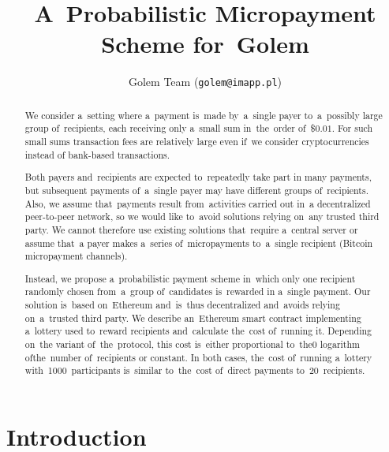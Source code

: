 \documentclass[a4paper]{article}
\title{A~Probabilistic Micropayment Scheme for~Golem}
\author{Golem Team (\texttt{golem@imapp.pl})}
\begin{document}
\maketitle

\begin{abstract}
    We consider a~setting where a~payment  is~made by~a~single payer
    to~a~possibly large group of~recipients, each receiving only a~small
    sum in~the~order of~\$$0.01$. For such small sums transaction fees are
    relatively large even if~we consider cryptocurrencies instead of
    bank-based transactions.

    Both payers and~recipients are expected to~repeatedly take part in
    many payments, but subsequent payments of~a~single payer may
    have different groups of~recipients. Also, we
    assume that~payments result from~activities carried out in~a
    decentralized peer-to-peer network, so we would like to~avoid
    solutions relying on~any trusted third party. We cannot therefore use
    existing solutions that~require a~central server or assume that~a
    payer makes a~series of~micropayments to~a~single recipient (Bitcoin
    micropayment channels).

    Instead, we propose a~probabilistic payment scheme in~which only one
    recipient randomly chosen from~a~group of~candidates  is~rewarded in
    a~single payment. Our solution  is~based on~Ethereum and~is~thus
    decentralized and~avoids relying on~a~trusted third party. We describe
    an~Ethereum smart contract implementing a~lottery used to~reward
    recipients and~calculate the~cost of~running it. Depending on~the
    variant of~the~protocol, this cost  is~either proportional to~the0
    logarithm ofthe~number of~recipients or constant. In both cases,
    the~cost of~running a~lottery with~1000~participants is~similar
    to~the~cost of~direct payments to~20~recipients.
\end{abstract}

\section{Introduction}
\label{sec:intro}
\end{document}

